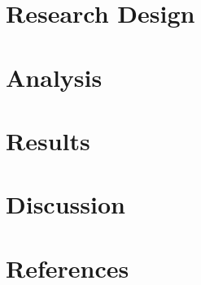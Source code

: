 \documentclass[review]{elsarticle}
\begin{document}
\section{Research Design}\label{sec:data}




\section{Analysis}\label{sec:methodology}
%


\section{Results}\label{sec:result}

\clearpage

\section{Discussion}\label{sec:discussion}


\section*{References}


\end{document}
